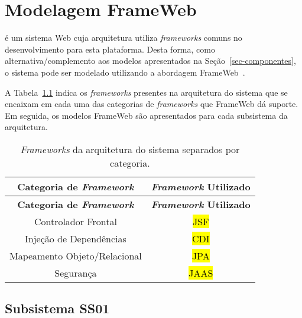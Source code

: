 
\chapter{Modelagem FrameWeb}
\label{sec-frameweb}
\vspace{-1cm}

\emph{\imprimirtitulo} é um sistema Web cuja arquitetura utiliza \textit{frameworks} comuns no desenvolvimento para esta plataforma. Desta forma, como alternativa/complemento aos modelos apresentados na Seção~\ref{sec-componentes}, o sistema pode ser modelado utilizando a abordagem FrameWeb~\cite{souza-celebratingfalbo20}.


A Tabela~\ref{tabela-frameworks} indica os \textit{frameworks} presentes na arquitetura do sistema que se encaixam em cada uma das categorias de \textit{frameworks} que FrameWeb dá suporte. Em seguida, os modelos FrameWeb são apresentados para cada subsistema da arquitetura.

\begin{footnotesize}
	\begin{longtable}{|c|c|}
		\caption{\textit{Frameworks} da arquitetura do sistema separados por categoria.}
		\label{tabela-frameworks}\\\hline
		
		\rowcolor{lightgray}
		\textbf{Categoria de \textit{Framework}} & \textbf{\textit{Framework} Utilizado} \\\hline 
		\endfirsthead
		\hline
		\rowcolor{lightgray}
		\textbf{Categoria de \textit{Framework}} & \textbf{\textit{Framework} Utilizado} \\\hline 
		\endhead

		Controlador Frontal & \hl{JSF} \\\hline

		Injeção de Dependências & \hl{CDI} \\\hline

		Mapeamento Objeto/Relacional & \hl{JPA} \\\hline

		Segurança & \hl{JAAS} \\\hline
	\end{longtable}
\end{footnotesize}


\section{Subsistema SS01}
\label{sec-frameweb-ss01}

